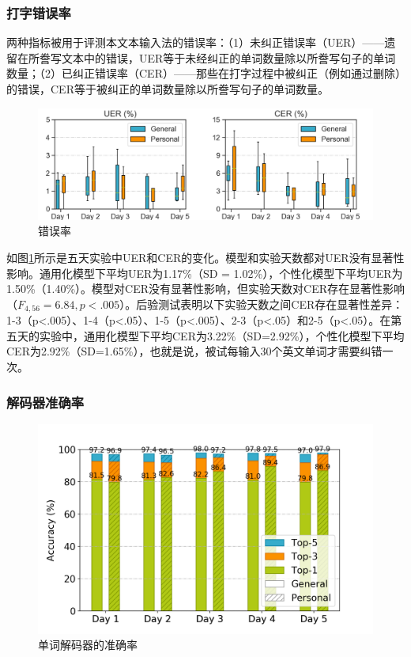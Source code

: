 \subsubsection{打字错误率}

两种指标被用于评测本文本输入法的错误率：（1）未纠正错误率（UER）——遗留在所誊写文本中的错误，UER等于未经纠正的单词数量除以所誊写句子的单词数量；（2）已纠正错误率（CER）——那些在打字过程中被纠正（例如通过删除）的错误，CER等于被纠正的单词数量除以所誊写句子的单词数量。

\begin{figure}[!htbp]
	\centering
	\includegraphics[width=1.0\linewidth]{figures/QwertyRing_uer_cer.png}
	\caption*{图中展示了被试采用通用化模型或个性化模型时的打字错误率随实验天数而变化的箱型图。}
	\caption{错误率}
	\label{fig:QwertyRing_uer_cer}
\end{figure}

如图\ref{fig:QwertyRing_uer_cer}所示是五天实验中UER和CER的变化。模型和实验天数都对UER没有显著性影响。通用化模型下平均UER为1.17\%（SD = 1.02\%），个性化模型下平均UER为1.50\%（1.40\%）。模型对CER没有显著性影响，但实验天数对CER存在显著性影响（$F_{4,56}=6.84,p<.005$）。后验测试表明以下实验天数之间CER存在显著性差异：1-3（p<.005）、1-4（p<.05）、1-5（p<.005）、2-3（p<.05）和2-5（p<.05）。在第五天的实验中，通用化模型下平均CER为3.22\%（SD=2.92\%），个性化模型下平均CER为2.92\%（SD=1.65\%），也就是说，被试每输入30个英文单词才需要纠错一次。

\subsubsection{解码器准确率}

\begin{figure}[!htbp]
	\centering
	\includegraphics[width=0.8\linewidth]{figures/QwertyRing_predict_acc.png}
	\caption*{图中展示了两种模型下单词解码器的准确率随实验天数而变化的柱状图，准确率指标包括Top-1、Top-3和Top-5准确率。}
	\caption{单词解码器的准确率}
	\label{fig:QwertyRing_predict_acc}
\end{figure}

